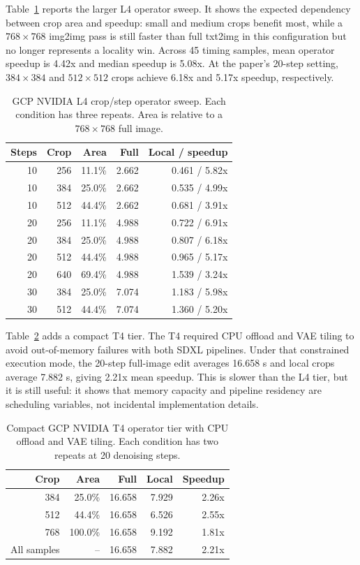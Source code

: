 \documentclass[final,5p,times,number,sort&compress]{elsarticle}
\begin{document}
Table~\ref{tab:l4-sweep} reports the larger L4 operator sweep. It shows the expected dependency between crop area and speedup: small and medium crops benefit most, while a \(768 \times 768\) img2img pass is still faster than full txt2img in this configuration but no longer represents a locality win. Across 45 timing samples, mean operator speedup is 4.42x and median speedup is 5.08x. At the paper's 20-step setting, \(384 \times 384\) and \(512 \times 512\) crops achieve 6.18x and 5.17x speedup, respectively.

\begin{table}[t]
\centering
\scriptsize
\caption{GCP NVIDIA L4 crop/step operator sweep. Each condition has three repeats. Area is relative to a \(768 \times 768\) full image.}
\label{tab:l4-sweep}
\begin{tabular}{rrrrr}
\toprule
Steps & Crop & Area & Full & Local / speedup \\
\midrule
10 & 256 & 11.1\% & 2.662 & 0.461 / 5.82x \\
10 & 384 & 25.0\% & 2.662 & 0.535 / 4.99x \\
10 & 512 & 44.4\% & 2.662 & 0.681 / 3.91x \\
20 & 256 & 11.1\% & 4.988 & 0.722 / 6.91x \\
20 & 384 & 25.0\% & 4.988 & 0.807 / 6.18x \\
20 & 512 & 44.4\% & 4.988 & 0.965 / 5.17x \\
20 & 640 & 69.4\% & 4.988 & 1.539 / 3.24x \\
30 & 384 & 25.0\% & 7.074 & 1.183 / 5.98x \\
30 & 512 & 44.4\% & 7.074 & 1.360 / 5.20x \\
\bottomrule
\end{tabular}
\end{table}

Table~\ref{tab:t4-tier} adds a compact T4 tier. The T4 required CPU offload and VAE tiling to avoid out-of-memory failures with both SDXL pipelines. Under that constrained execution mode, the 20-step full-image edit averages 16.658 s and local crops average 7.882 s, giving 2.21x mean speedup. This is slower than the L4 tier, but it is still useful: it shows that memory capacity and pipeline residency are scheduling variables, not incidental implementation details.

\begin{table}[t]
\centering
\scriptsize
\caption{Compact GCP NVIDIA T4 operator tier with CPU offload and VAE tiling. Each condition has two repeats at 20 denoising steps.}
\label{tab:t4-tier}
\begin{tabular}{rrrrr}
\toprule
Crop & Area & Full & Local & Speedup \\
\midrule
384 & 25.0\% & 16.658 & 7.929 & 2.26x \\
512 & 44.4\% & 16.658 & 6.526 & 2.55x \\
768 & 100.0\% & 16.658 & 9.192 & 1.81x \\
\midrule
All samples & -- & 16.658 & 7.882 & 2.21x \\
\bottomrule
\end{tabular}
\end{table}
\end{document}
